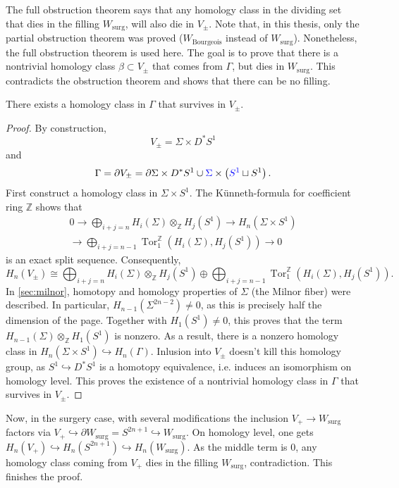 The full obstruction theorem says that any homology class in the dividing set that dies in the filling $W_\text{surg}$, will also
die in $V_{\pm}$.
Note that, in this thesis, only the partial obstruction theorem was proved ($W_\text{Bourgeois}$ instead of $W_\text{surg}$).
Nonetheless, the full obstruction theorem is used here.
The goal is to prove that there is a nontrivial homology class $\beta \subset V_\pm$ that
comes from $\Gamma$, but dies in $W_\text{surg}$. This contradicts the obstruction theorem and shows that there can be no filling.

\begin{lemma}
    There exists a homology class in $\Gamma$ that survives in $V_\pm$.
\end{lemma}
\begin{proof}
    By construction,
    \[
        V_\pm = \Sigma \times D^*S^1
    \]
    and
    \[
        \Gamma = \partial V_\pm = \partial \Sigma \times D^*S^1 \cup \textcolor{blue}{\Sigma} \times \left(\textcolor{blue}{S^1} \sqcup S^1\right).
    \]
    First construct a homology class in $\Sigma \times S^1$.
    The Künneth-formula for coefficient ring $\mathbb Z$ shows that
    \begin{multline}
        0 \to \bigoplus_{i+j = n} H_i(\Sigma) \otimes_{\mathbb Z} H_j(S^1) \to  H_n(\Sigma \times S^1)\\
        \to \bigoplus_{i+j = n-1} \operatorname{Tor}^\mathbb{Z}_1\left(H_i(\Sigma), H_j(S^1)\right) \to 0
    \end{multline}
    is an exact split sequence.
    Consequently,
    \[
        H_n(V_\pm) \cong \bigoplus_{i+j = n} H_i(\Sigma) \otimes_{\mathbb Z} H_j(S^1) \oplus 
        \bigoplus_{i+j = n-1} \operatorname{Tor}^\mathbb{Z}_1\left(H_i(\Sigma), H_j(S^1)\right).
    \]
    In \cref{sec:milnor}, homotopy and homology properties of $\Sigma$ (the Milnor fiber) were described.
    In particular, $H_{n-1}(\Sigma^{2n-2}) \neq 0$, as this is precisely half the dimension of the page.
    Together with $H_1(S^1) \neq 0$, this proves that the term $H_{n-1}(\Sigma) \otimes_{\mathbb Z} H_1(S^1)$ is nonzero. As a result, 
    there is a nonzero homology class in $H_n(\Sigma \times S^1) \hookrightarrow H_n(\Gamma)$.
    Inlusion into $V_\pm$ doesn't kill this homology group, as $S^1 \hookrightarrow D^*S^1$ is a homotopy equivalence,
    i.e. induces an isomorphism on homology level. 
    This proves the existence of a nontrivial homology class in $\Gamma$ that survives in $V_\pm$.
\end{proof}

Now, in the surgery case, with several modifications the inclusion
$V_+ \to W_\text{surg}$ factors via $V_+ \hookrightarrow \partial W_\text{surg} = S^{2n+1} \hookrightarrow W_\text{surg}$.
On homology level, one gets
$H_n(V_+) \hookrightarrow H_n(S^{2n+1}) \hookrightarrow H_n(W_\text{surg})$.
As the middle term is $0$, any homology class coming from $V_+$ dies in the filling $W_\text{surg}$, contradiction.
This finishes the proof.